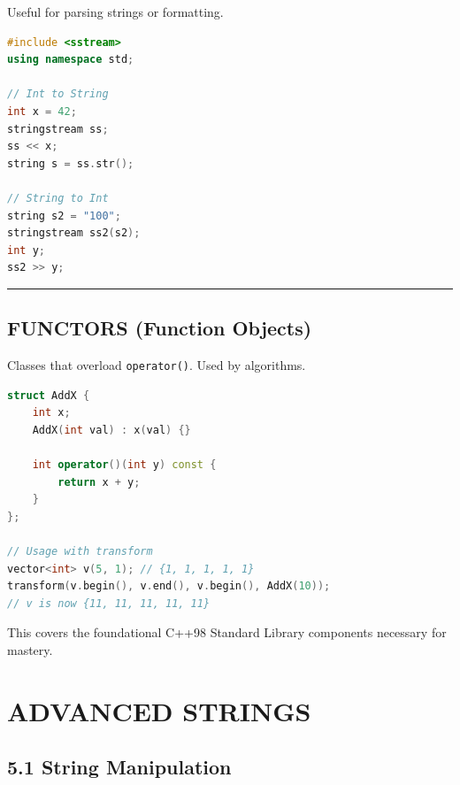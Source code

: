 Useful for parsing strings or formatting.

\begin{lstlisting}[language={C++}]
#include <sstream>
using namespace std;

// Int to String
int x = 42;
stringstream ss;
ss << x;
string s = ss.str();

// String to Int
string s2 = "100";
stringstream ss2(s2);
int y;
ss2 >> y;
\end{lstlisting}

\begin{center}\rule{0.5\linewidth}{0.5pt}\end{center}

\hypertarget{functors-function-objects}{%
\subsection{FUNCTORS (Function
Objects)}\label{functors-function-objects}}

Classes that overload \passthrough{\lstinline!operator()!}. Used by
algorithms.

\begin{lstlisting}[language={C++}]
struct AddX {
    int x;
    AddX(int val) : x(val) {}

    int operator()(int y) const {
        return x + y;
    }
};

// Usage with transform
vector<int> v(5, 1); // {1, 1, 1, 1, 1}
transform(v.begin(), v.end(), v.begin(), AddX(10));
// v is now {11, 11, 11, 11, 11}
\end{lstlisting}

This covers the foundational C++98 Standard Library components necessary
for mastery.

\hypertarget{advanced-strings}{%
\section{ADVANCED STRINGS}\label{advanced-strings}}

\hypertarget{string-manipulation}{%
\subsection{5.1 String Manipulation}\label{string-manipulation}}

